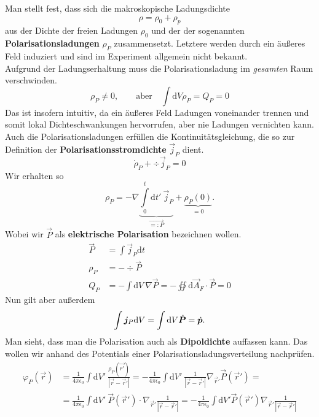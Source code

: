 Man stellt fest, dass sich die makroskopische Ladungsdichte 
\begin{equation*}
\rho = \rho_0 + \rho_p
\end{equation*}
aus der Dichte der freien Ladungen $\rho_0$ und der der sogenannten \textbf{Polarisationsladungen} $\rho_P$ zusammensetzt. Letztere werden durch ein äußeres Feld induziert und sind im Experiment allgemein nicht bekannt. \\
Aufgrund der Ladungserhaltung muss die Polarisationsladung im \emph{gesamten }Raum verschwinden.
\begin{equation*}
\rho_P\neq 0, \qquad \text{aber}\quad \int\mathrm{d}V \rho_P = Q_P = 0
\end{equation*}
Das ist insofern intuitiv, da ein äußeres Feld Ladungen voneinander trennen und somit lokal Dichteschwankungen hervorrufen, aber nie Ladungen vernichten kann. \\
Auch die Polarisationsladungen erfüllen die Kontinuitätsgleichung, die so zur Definition der \textbf{Polarisationsstromdichte} $\vec{j}_P$ dient.
\begin{equation*}
\dot{\rho}_P+\div\vec{j}_P=0
\end{equation*}
Wir erhalten so 
\begin{equation*}
\rho_P = -\nabla\underbrace{\int\limits_0^t\mathrm{d}t'\ \vec{j}_P}_{\vec{=:P}} + \underbrace{\rho_P(0)}_{=0}.
\end{equation*}
Wobei wir $\vec{P}$ als \textbf{elektrische Polarisation} bezeichnen wollen.
\begin{align*}
\vec{P} &=\int\vec{j}_P\mathrm{d}t\\
\rho_P &= -\div\vec{P}\\
Q_P &=-\int\mathrm{d}V\ \nabla\vec{P}=-\oiint\mathrm{d}\vec{A}_F\cdot\vec{P}=0
\end{align*}
Nun gilt aber außerdem
\begin{equation*}
\int\bm{j}_P\mathrm{d}V = \int\mathrm{d} V\dot{\bm{P}} = \dot{\bm{p}}.
\end{equation*}
Man sieht, dass man die Polarisation auch als \textbf{Dipoldichte} auffassen kann. Das wollen wir anhand des Potentials einer Polarisationsladungsverteilung nachprüfen.
\begin{align*}
\varphi_P(\vec{r}) &=\frac{1}{4\pi\epsilon_0} \int\mathrm{d}V'\ \frac{\rho_P(\vec{r'})}{|\vec{r}-\vec{r}'|} = -\frac{1}{4\pi\epsilon_0}\int\mathrm{d}V'\ \frac{1}{|\vec{r}-\vec{r}'|}\nabla_{\vec{r}'}\vec{P}(\vec{r}') = \\
&=\frac{1}{4\pi\epsilon_0}\int\mathrm{d}V'\ \vec{P}(\vec{r}')\cdot\nabla_{\vec{r}'}\frac{1}{|\vec{r}-\vec{r}'|} =-\frac{1}{4\pi\epsilon_0}\int\mathrm{d}V' \vec{P}(\vec{r}')\nabla_{\vec{r}'}\frac{1}{|\vec{r}-\vec{r}'|}
\end{align*}
